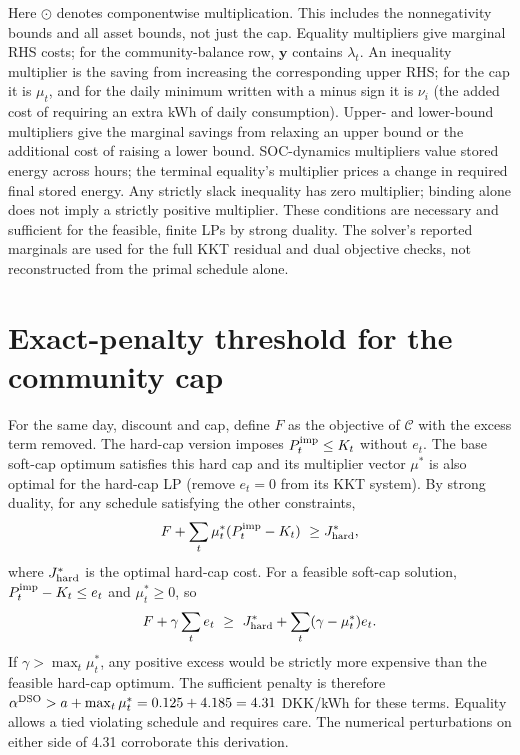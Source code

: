 \documentclass[10pt,a4paper]{article}
\newcommand{\Cmod}{\mathcal C}
\begin{document}
Here $\odot$ denotes componentwise multiplication. This includes the nonnegativity bounds and all asset bounds, not just the cap. Equality multipliers give marginal RHS costs; for the community-balance row, $\bm y$ contains $\lambda_t$. An inequality multiplier is the saving from increasing the corresponding upper RHS; for the cap it is $\mu_t$, and for the daily minimum written with a minus sign it is $\nu_i$ (the added cost of requiring an extra kWh of daily consumption). Upper- and lower-bound multipliers give the marginal savings from relaxing an upper bound or the additional cost of raising a lower bound. SOC-dynamics multipliers value stored energy across hours; the terminal equality's multiplier prices a change in required final stored energy. Any strictly slack inequality has zero multiplier; binding alone does not imply a strictly positive multiplier. These conditions are necessary and sufficient for the feasible, finite LPs by strong duality. The solver's reported marginals are used for the full KKT residual and dual objective checks, not reconstructed from the primal schedule alone.

\section{Exact-penalty threshold for the community cap}
\label{app:penalty}
For the same day, discount and cap, define $F$ as the objective of $\Cmod$ with the excess term removed. The hard-cap version imposes $P_t^{\rm imp}\le K_t$ without $e_t$. The base soft-cap optimum satisfies this hard cap and its multiplier vector $\mu^*$ is also optimal for the hard-cap LP (remove $e_t=0$ from its KKT system). By strong duality, for any schedule satisfying the other constraints,
\begin{equation}
F+\sum_t\mu_t^*(P_t^{\rm imp}-K_t)\ \geq J_{\rm hard}^*,
\end{equation}
where $J_{\rm hard}^*$ is the optimal hard-cap cost. For a feasible soft-cap solution, $P_t^{\rm imp}-K_t\le e_t$ and $\mu_t^*\ge0$, so
\begin{equation}
F+\gamma\sum_t e_t\ \geq\
J_{\rm hard}^*+\sum_t(\gamma-\mu_t^*)e_t .
\end{equation}
If $\gamma>\max_t\mu_t^*$, any positive excess would be strictly more expensive than the feasible hard-cap optimum. The sufficient penalty is therefore $\alpha^{\rm DSO}>a+\max_t\mu_t^*=0.125+4.185=4.31$ DKK/kWh for these terms. Equality allows a tied violating schedule and requires care. The numerical perturbations on either side of 4.31 corroborate this derivation.
\end{document}

